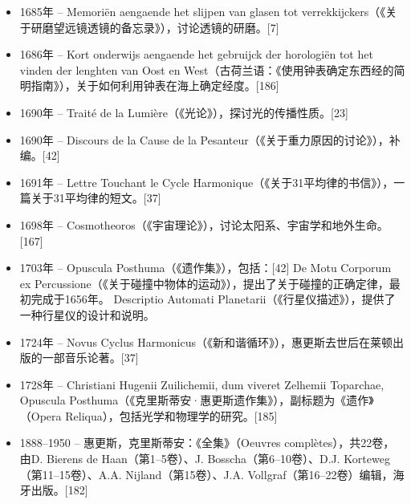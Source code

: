 \begin{itemize}
\item 1685年 – Memoriën aengaende het slijpen van glasen tot verrekkijckers（《关于研磨望远镜透镜的备忘录》），讨论透镜的研磨。[7]
\item 1686年 – Kort onderwijs aengaende het gebruijck der horologiën tot het vinden der lenghten van Oost en West（古荷兰语：《使用钟表确定东西经的简明指南》），关于如何利用钟表在海上确定经度。[186]
\item 1690年 – Traité de la Lumière（《光论》），探讨光的传播性质。[23]
\item 1690年 – Discours de la Cause de la Pesanteur（《关于重力原因的讨论》），补编。[42]
\item 1691年 – Lettre Touchant le Cycle Harmonique（《关于31平均律的书信》），一篇关于31平均律的短文。[37]
\item 1698年 – Cosmotheoros（《宇宙理论》），讨论太阳系、宇宙学和地外生命。[167]
\item 1703年 – Opuscula Posthuma（《遗作集》），包括：[42]
De Motu Corporum ex Percussione（《关于碰撞中物体的运动》），提出了关于碰撞的正确定律，最初完成于1656年。
Descriptio Automati Planetarii（《行星仪描述》），提供了一种行星仪的设计和说明。
\item 1724年 – Novus Cyclus Harmonicus（《新和谐循环》），惠更斯去世后在莱顿出版的一部音乐论著。[37]
\item 1728年 – Christiani Hugenii Zuilichemii, dum viveret Zelhemii Toparchae, Opuscula Posthuma（《克里斯蒂安·惠更斯遗作集》），副标题为《遗作》（Opera Reliqua），包括光学和物理学的研究。[185]
\item 1888–1950 – 惠更斯，克里斯蒂安：《全集》（Oeuvres complètes），共22卷，由D. Bierens de Haan（第1–5卷）、J. Bosscha（第6–10卷）、D.J. Korteweg（第11–15卷）、A.A. Nijland（第15卷）、J.A. Vollgraf（第16–22卷）编辑，海牙出版。[182]


\end{itemize}
